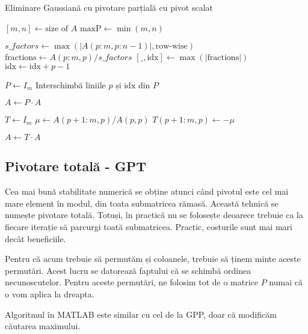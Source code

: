 \documentclass{exam}
\newcommand{\octavescript}[2]{
	
}
\begin{document}
\newpage
\begin{algorithm}
	\caption{Eliminare Gaussiană cu pivotare parțială cu pivot scalat}
	\begin{algorithmic}[1]
		\State \( [m, n] \gets \text{size of } A \)
		\State \( \text{maxP} \gets \min(m, n) \) 

		\State \( s\_factors \gets \max(|A(p:m, p:n-1)|, \text{row-wise}) \) 
		\State \( \text{fractions} \gets A(p:m, p) / s\_factors \) 
		\State \( [\_, \text{idx}] \gets \max(|\text{fractions}|) \) 
		\State \( \text{idx} \gets \text{idx} + p - 1 \) 

		\State \( P \gets I_m \) 
		\State Interschimbă liniile \( p \) și \( \text{idx} \) din \( P \)

		\State \( A \gets P \cdot A \) 

		\State \( T \gets I_m \) 
		\State \( \mu \gets A(p+1:m, p) / A(p, p) \) 
		\State \( T(p+1:m, p) \gets -\mu \) 

		\State \( A \gets T \cdot A \) 
		\EndFor
	\end{algorithmic}
\end{algorithm}


\subsection{Pivotare totală - GPT}

Cea mai bună stabilitate numerică se obține atunci când pivotul este cel
mai mare element în modul, din toata submatricea rămasă. Această tehnică se
numește pivotare totală. Totuși, în practică nu se folosește deoarece trebuie
ca la fiecare iterație să parcurgi toată submatricea. Practic, costurile
sunt mai mari decât beneficiile.

Pentru că acum trebuie să permutăm și coloanele, trebuie să ținem minte
aceste permutări. Acest lucru se datorează faptului că se schimbă ordinea
necunoscutelor. Pentru aceste permutări, ne folosim tot de o matrice $P$ numai
că o vom aplica la dreapta.

Algoritmul în MATLAB este similar cu cel de la GPP, doar că modificăm
căutarea maximului.
\end{document}
